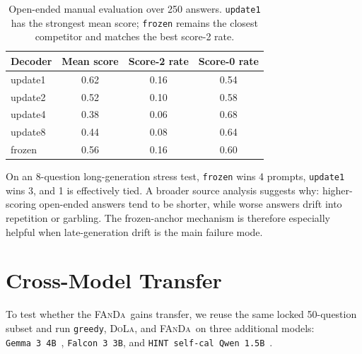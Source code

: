 \documentclass[10pt,twocolumn,letterpaper]{article}
\newcommand{\fanda}{\textsc{FAnDa}}
\newcommand{\dola}{\textsc{DoLa}}
\begin{document}
\begin{table}[t]
    \centering
    \small
    \begin{tabular}{lccc}
        \toprule
        Decoder & Mean score & Score-2 rate & Score-0 rate \\
        \midrule
        update1 & 0.62 & 0.16 & 0.54 \\
        update2 & 0.52 & 0.10 & 0.58 \\
        update4 & 0.38 & 0.06 & 0.68 \\
        update8 & 0.44 & 0.08 & 0.64 \\
        frozen  & 0.56 & 0.16 & 0.60 \\
        \bottomrule
    \end{tabular}
    \caption{Open-ended manual evaluation over 250 answers. \texttt{update1} has the strongest mean score; \texttt{frozen} remains the closest competitor and matches the best score-2 rate.}
    \label{tab:openended}
\end{table}

On an 8-question long-generation stress test, \texttt{frozen} wins 4 prompts, \texttt{update1} wins 3, and 1 is effectively tied. A broader source analysis suggests why: higher-scoring open-ended answers tend to be shorter, while worse answers drift into repetition or garbling. The frozen-anchor mechanism is therefore especially helpful when late-generation drift is the main failure mode.

\section{Cross-Model Transfer}
To test whether the \fanda\ gains transfer, we reuse the same locked 50-question subset and run \texttt{greedy}, \dola, and \fanda\ on three additional models: \texttt{Gemma~3~4B}~\cite{gemma3}, \texttt{Falcon~3~3B}, and \texttt{HINT self-cal Qwen~1.5B}~\cite{hint_selfcal}.
\end{document}
